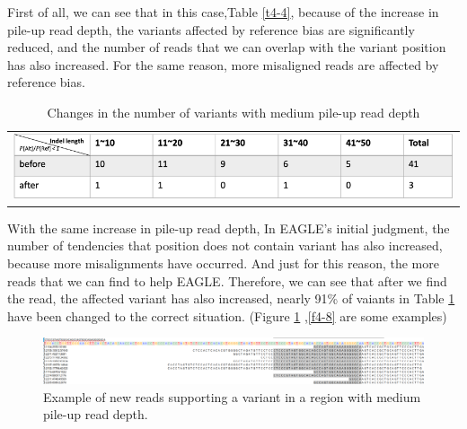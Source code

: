 First of all, we can see that in this case,Table \ref{t4-4}, because of the increase in pile-up read depth, the variants affected by reference bias are significantly reduced, and the number of reads that we can overlap with the variant position has also increased. For the same reason, more misaligned reads are affected by reference bias.

\vspace{1cm}
\begin{table}[h]
    \centering
    \caption[Changes in the number of variants with medium pile-up read depth]{Changes in the number of variants with medium pile-up read depth}
    \vspace{-0.5cm}
    \begin{tabular}{c}
        \includegraphics[width=1\textwidth]{body/image/t4-5.png}
    \end{tabular}
    \label{t4-5}
\end{table}

With the same increase in pile-up read depth, In EAGLE’s initial judgment, the number of tendencies that position does not contain variant has also increased, because more misalignments have occurred. And just for this reason, the more reads that we can find to help EAGLE. Therefore, we can see that after we find the read, the affected variant has also increased, nearly 91\% of vaiants in Table \ref{t4-5} have been changed to the correct situation. (Figure \ref{f4-7} ,\ref{f4-8} are some examples)

\vspace{1cm}
\begin{figure}[H]
    \centering
    \includegraphics[width=1\columnwidth]{body/image/4-7.png}
    \captionsetup{labelfont=bf}
    \renewcommand{\baselinestretch}{1.0}
    \vspace{-1cm}
    \caption[New reads in a region with medium pile-up read depth]{Example of new reads supporting a variant in a region with medium pile-up read depth.}
    \label{f4-7}
\end{figure}

